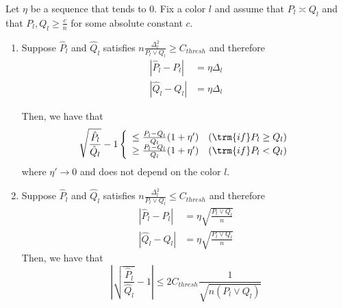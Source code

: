 \documentclass{article}
\begin{document}
\begin{lemma}
\label{lem:sqrt_ratio_pl_ql_minus_1}
Let $\eta$ be a sequence that tends to 0. Fix a color $l$ and assume that $P_l \asymp Q_l$ and that $P_l, Q_l \geq \frac{c}{n}$ for some absolute constant $c$. 
\begin{enumerate}
\item 
Suppose $\hat{P}_l$ and $\hat{Q}_l$ satisfies $n \frac{\Delta_l^2}{P_l \vee Q_l} \geq C_{thresh}$ and therefore
\begin{align*}
| \hat{P}_l - P_l | &= \eta \Delta_l  \\
| \hat{Q}_l - Q_l | &= \eta \Delta_l  
\end{align*}

Then, we have that 
\[
\sqrt{ \frac{\hat{P}_l }{\hat{Q}_l} } - 1 \left\{ \begin{array}{cc} 
                    \leq \frac{P_l - Q_l}{Q_l} (1 + \eta') & (\trm{if }  P_l \geq Q_l) \\
                    \geq \frac{P_l - Q_l}{Q_l} (1 + \eta') & (\trm{if } P_l < Q_l) 
           \end{array} \right.
\]
where $\eta' \rightarrow 0$ and does not depend on the color $l$. 

\item
Suppose $\hat{P}_l$ and $\hat{Q}_l$ satisfies $n \frac{\Delta_l^2}{P_l \vee Q_l} \leq C_{thresh}$ and therefore
\begin{align*}
| \hat{P}_l - P_l | &= \eta \sqrt{ \frac{P_l \vee Q_l}{n} } \\
| \hat{Q}_l - Q_l | &= \eta \sqrt{ \frac{P_l \vee Q_l}{n} }
\end{align*}
Then, we have that
\[
\left| \sqrt{ \frac{\hat{P}_l}{\hat{Q}_l} } - 1 \right| \leq
 2 C_{thresh} \frac{1}{\sqrt{n  (P_l \vee Q_l) } }
\]

\end{enumerate}
\end{lemma}
\end{document}
